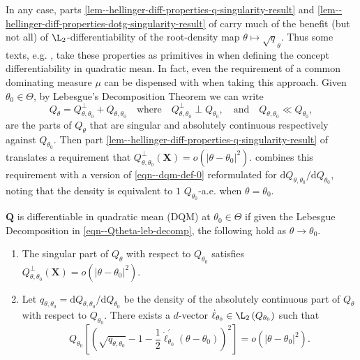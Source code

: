 In any case, parts \ref{lem--hellinger-diff-properties-q-singularity-result} and
\ref{lem--hellinger-diff-properties-dotg-singularity-result} of
 carry much of the benefit (but not all) of
\(\L_{2}\)-differentiability of the root-density map \(\theta \mapsto
\sqrt{q}_{\theta}\).
Thus some texts, e.g. \citet{2000lecamAsymptoticsStatisticsBasic}, take these
properties as primitives in when defining the concept differentiability in
quadratic mean.
In fact, even the requirement of a common dominating measure \(\mu\) can be
dispensed with when taking this approach.
Given \(\theta_{0} \in \Theta\), by Lebesgue's Decomposition Theorem we can
write
\begin{equation}
  Q_{\theta} = Q_{\theta, \theta_{0}}^{\perp} + Q_{\theta, \theta_{0}}
  \quad \text{where} \quad
  Q_{\theta, \theta_{0}}^{\perp} \perp Q_{\theta_{0}},
  \quad \text{and} \quad
  Q_{\theta, \theta_{0}} \ll Q_{\theta_{0}},
  \label{eqn--Qtheta-leb-decomp}
\end{equation}
are the parts of \(Q_{\theta}\) that are singular and absolutely continuous
respectively against \(Q_{\theta_{0}}\).
Then part \ref{lem--hellinger-diff-properties-q-singularity-result}
of  translates a requirement that
\(Q_{\theta, \theta_{0}}^{\perp} (\mathbf{X}) = o \left( |\theta -
\theta_{0}|^{2} \right)\).
 combines this requirement with a version of
\eqref{eqn--dqm-def-0} reformulated for \(\mathrm{d} Q_{\theta,
\theta_{0}} / \mathrm{d} Q_{\theta_{0}}\), noting that the density is equivalent
to \(1\)
\(Q_{\theta_{0}}\)-a.e. when \(\theta = \theta_{0}\).

\begin{definition}
\label{def--dqm}
\(\mathbf{Q}\) is differentiable in quadratic mean (DQM) at \(\theta_{0} \in
\Theta\) if given the Lebesgue Decomposition in \eqref{eqn--Qtheta-leb-decomp},
the following hold as \(\theta \to \theta_{0}\).
\begin{enumerate}[label=(\roman*)]
  \item \label{def--dqm-sing}
    The singular part of \(Q_{\theta}\) with respect to \(Q_{\theta_{0}}\)
    satisfies
    \(Q_{\theta, \theta_{0}}^{\perp} (\mathbf{X}) = o \left( \left| \theta -
    \theta_{0} \right|^{2} \right)\).
  \item \label{def--dqm-ac-diff}
    Let \(q_{\theta, \theta_{0}} = \mathrm{d} Q_{\theta, \theta_{0}} /
    \mathrm{d} Q_{\theta_{0}}\) be the density of the absolutely continuous part
    of \(Q_{\theta}\) with respect to \(Q_{\theta_{0}}\).
    There exists a \(d\)-vector \(\dot{\ell}_{\theta_{0}} \in \L_{2} \left(
    Q_{\theta_{0}} \right)\) such that
    \begin{equation}
      Q_{\theta_{0}} \left[ \left( \sqrt{q_{\theta, \theta_{0}}} - 1 -
      \frac{1}{2} \dot{\ell}_{\theta_{0}}^{\prime} \left( \theta - \theta_{0}
      \right) \right)^{2} \right] = o \left( \left| \theta - \theta_{0}
      \right|^{2} \right).
      \label{eqn--dqm-def}
    \end{equation}
\end{enumerate}
\end{definition}

